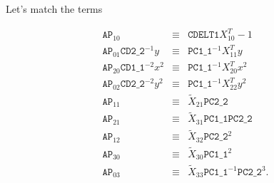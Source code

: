 \documentclass[10pt]{article}
\newcommand{\sipAP}[2]{\ensuremath{\mathtt{AP}_{#1 #2}}}
\newcommand{\siafXP}[2]{\ensuremath{X^{T}_{#1 #2}}}
\newcommand{\NCu}{\ensuremath{\mathtt{PC1\_1}}}
\newcommand{\NCv}{\ensuremath{\mathtt{PC2\_2}}}
\newcommand{\CDu}{\ensuremath{\mathtt{CD1\_1}}}
\newcommand{\CDv}{\ensuremath{\mathtt{CD2\_2}}}
\begin{document}
Let's match the terms


\begin{eqnarray}
\label{eqn:matched_inv}
\sipAP{1}{0} &\equiv& \mathtt{CDELT1}\siafXP{1}{0} - 1 \\
\sipAP{0}{1} \CDv^{-1} y &\equiv& \NCu^{-1} \siafXP{1}{1} y \\
\sipAP{2}{0} \CDu^{-2} x^2 &\equiv& \NCu^{-1}  \siafXP{2}{0} x^2\\
\sipAP{0}{2} \CDv^{-2} y^2 &\equiv& \NCu^{-1} \siafXP{2}{2} y^2\\
\sipAP{1}{1} &\equiv& \tilde{X}_{21} \NCv \\
\sipAP{2}{1} &\equiv& \tilde{X}_{31} \NCu \NCv \\
\sipAP{1}{2} &\equiv& \tilde{X}_{32} \NCv^{2} \\
\sipAP{3}{0} &\equiv& \tilde{X}_{30} \NCu^{2} \\
\sipAP{0}{3} &\equiv& \tilde{X}_{33} \NCu^{-1} \NCv^{3}.
\end{eqnarray}
\end{document}
